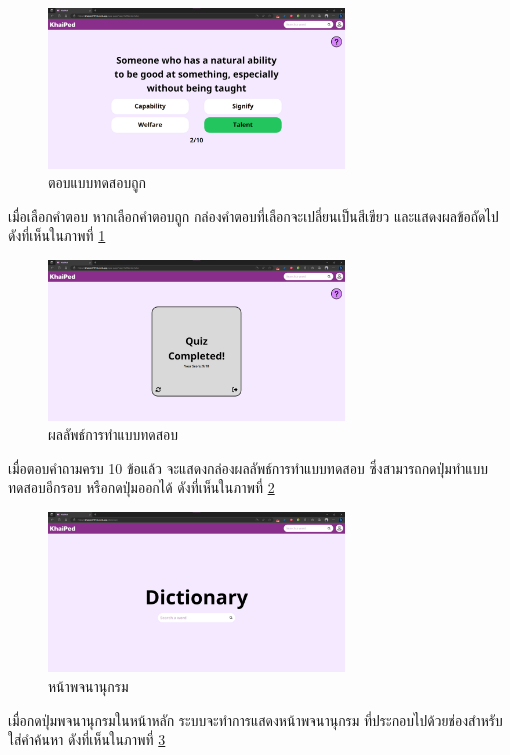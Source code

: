 \documentclass[12pt,oneside,openright,a4paper]{cpe-thai-project}
\begin{document}
\pagebreak
\begin{figure}[!h]\centering
	\includegraphics[width=0.7\textwidth, keepaspectratio=true]{image/chap4/UI/quiz/correct.png}
	\caption{{ตอบแบบทดสอบถูก}}\label{fig:chap4UIQuizCorrect}
\end{figure}
\hspace{1cm}
เมื่อเลือกคำตอบ หากเลือกคำตอบถูก กล่องคำตอบที่เลือกจะเปลี่ยนเป็นสีเขียว และแสดงผลข้อถัดไป
ดังที่เห็นในภาพที่ \ref{fig:chap4UIQuizCorrect}

\begin{figure}[!h]\centering
	\includegraphics[width=0.7\textwidth, keepaspectratio=true]{image/chap4/UI/quiz/result.png}
	\caption{{ผลลัพธ์การทำแบบทดสอบ}}\label{fig:chap4UIQuizResult}
\end{figure}
\hspace{1cm}
เมื่อตอบคำถามครบ 10 ข้อแล้ว จะแสดงกล่องผลลัพธ์การทำแบบทดสอบ ซึ่งสามารถกดปุ่มทำแบบทดสอบอีกรอบ หรือกดปุ่มออกได้
ดังที่เห็นในภาพที่ \ref{fig:chap4UIQuizResult}

\pagebreak
\begin{figure}[!h]\centering
	\includegraphics[width=0.7\textwidth, keepaspectratio=true]{image/chap4/UI/dict/dict.png}
	\caption{{หน้าพจนานุกรม}}\label{fig:chap4UIDict}
\end{figure}
\hspace{1cm}
เมื่อกดปุ่มพจนานุกรมในหน้าหลัก ระบบจะทำการแสดงหน้าพจนานุกรม ที่ประกอบไปด้วยช่องสำหรับใส่คำค้นหา
ดังที่เห็นในภาพที่ \ref{fig:chap4UIDict}
\end{document}
